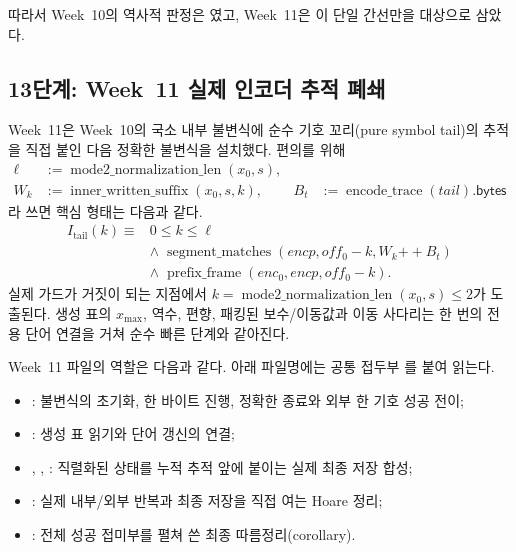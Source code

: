 따라서 Week~10의 역사적 판정은 였고, Week~11은
이 단일 간선만을 대상으로 삼았다.

\subsection{13단계: Week~11 실제 인코더 추적 폐쇄}

Week~11은 Week~10의 국소 내부 불변식에 순수 기호 꼬리(pure symbol tail)의
추적을 직접 붙인 다음 정확한 불변식을 설치했다. 편의를 위해
\[
\begin{aligned}
 \ell&:=\operatorname{mode2\_normalization\_len}(x_0,s),\\
 W_k&:=\operatorname{inner\_written\_suffix}(x_0,s,k),&
 B_t&:=\operatorname{encode\_trace}(tail).\mathsf{bytes}
\end{aligned}
\]
라 쓰면 핵심 형태는 다음과 같다.
\[
\begin{aligned}
 I_{\mathrm{tail}}(k) \equiv{}&
 0\le k\le \ell\\
 &\land\;\operatorname{segment\_matches}\!\left(
   encp,off_0-k,W_k\mathbin{++}B_t\right)\\
 &\land\;\operatorname{prefix\_frame}(enc_0,encp,off_0-k).
\end{aligned}
\]
실제 가드가 거짓이 되는 지점에서
\(k=\operatorname{mode2\_normalization\_len}(x_0,s)\le2\)가 도출된다. 생성
표의 \(x_{\max}\), 역수, 편향, 패킹된 보수/이동값과 이동 사다리는 한 번의
전용 단어 연결을 거쳐 순수 빠른 단계와 같아진다.

Week~11 파일의 역할은 다음과 같다. 아래 파일명에는 공통 접두부
를 붙여 읽는다.
\begin{itemize}
  \item {}: 불변식의 초기화, 한
        바이트 진행, 정확한 종료와 외부 한 기호 성공 전이;
  \item {}: 생성 표 읽기와 단어 갱신의 연결;
  \item {},
        ,
        : 직렬화된 상태를
        누적 추적 앞에 붙이는 실제 최종 저장 합성;
  \item {}: 실제 내부/외부 반복과 최종 저장을
        직접 여는 Hoare 정리;
  \item {}: 전체 성공 접미부를 펼쳐 쓴 최종
        따름정리(corollary).
\end{itemize}

